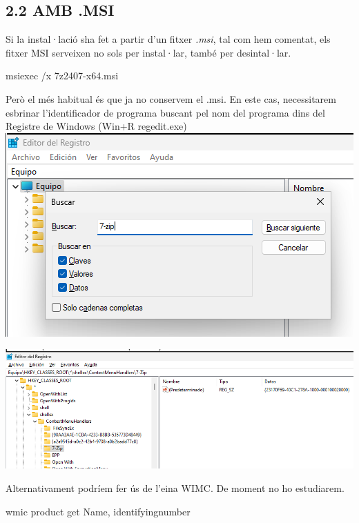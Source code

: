 \documentclass[
  a4paper,
]{article}
\newenvironment{Shaded}{\begin{snugshade}}{\end{snugshade}}
\newcommand{\AttributeTok}[1]{\textcolor[rgb]{0.13,0.29,0.53}{#1}}
\newcommand{\NormalTok}[1]{#1}
\begin{document}
\subsection{2.2 AMB .MSI}\label{amb-.msi}

Si la instal·lació sha fet a partir d'un fitxer \emph{.msi}, tal com hem
comentat, els fitxer MSI serveixen no sols per instal·lar, també per
desintal·lar.

\begin{Shaded}
\begin{Highlighting}[]
\NormalTok{msiexec }\AttributeTok{/x}\NormalTok{ 7z2407}\AttributeTok{{-}x64}\NormalTok{.msi}
\end{Highlighting}
\end{Shaded}

Però el més habitual és que ja no conservem el .msi. En este cas,
necessitarem esbrinar l'identificador de programa buscant pel nom del
programa dins del Registre de Windows (Win+R regedit.exe)
\includegraphics{png/buscaralRegistre.png}

\includegraphics{png/productCodeRegedit.png}

Alternativament podríem fer ús de l'eina WIMC. De moment no ho
estudiarem.

\begin{Shaded}
\begin{Highlighting}[]
\NormalTok{wmic product get Name, identifyingnumber}
\end{Highlighting}
\end{Shaded}
\end{document}
